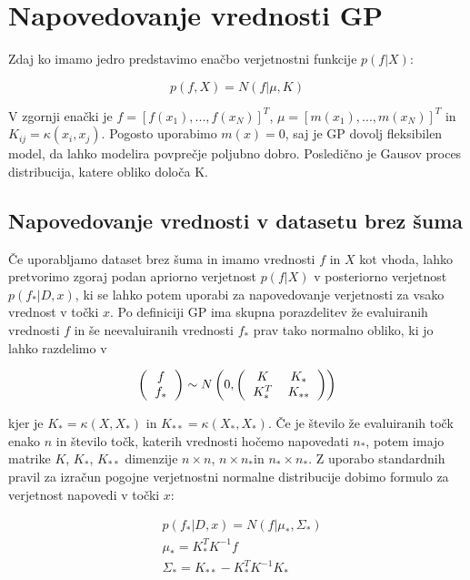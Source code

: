 \documentclass[a4paper, 12pt]{book}
\begin{document}
\section{Napovedovanje vrednosti GP}

Zdaj ko imamo jedro predstavimo enačbo verjetnostni funkcije $p(f|X)$:

\begin{equation}
	p(f,X) = N(f|\mu, K)
\end{equation}

V zgornji enački je $f = {[f(x_1), ..., f(x_N)]}^T$, $\mu = {[m(x_1), ..., m(x_N)]}^T$ in $K_{ij} = \kappa(x_i,x_j)$.
Pogosto uporabimo $m(x)=0$, saj je GP dovolj fleksibilen model, da lahko modelira povprečje poljubno dobro.
Posledično je Gausov proces distribucija, katere obliko določa K.

\subsection{Napovedovanje vrednosti v datasetu brez šuma}

Če uporabljamo dataset brez šuma in imamo vrednosti $f$ in $X$ kot vhoda, lahko pretvorimo zgoraj podan apriorno verjetnost $p(f|X)$ v posteriorno verjetnost $p(f_*| D,x)$, ki se lahko potem uporabi za napovedovanje verjetnosti za vsako vrednost v točki $x$.
Po definiciji GP ima skupna porazdelitev že evaluiranih vrednosti $f$ in še neevaluiranih vrednosti $f_*$ prav tako normalno obliko, ki jo lahko razdelimo v

\begin{equation}
\left(
\begin{tabular}{c} 
$f$ \\
 $f_*$
\end{tabular}
 \right) \sim N
 \left( 0, \left(
 \begin{tabular}{cc} 
 $K$ & $K_*$ \\
 $K_*^T$ & $K_{**}$
 \end{tabular}
 \right)
 \right)
\end{equation}

kjer je $K_* = \kappa(X,X_*)$ in $K_{**} = \kappa(X_*,X_*)$.
Če je število že evaluiranih točk enako $n$ in število točk, katerih vrednosti hočemo napovedati $n_*$, potem imajo matrike $K$, $K_*$, $K_{**}$ dimenzije $n \times n$, $n \times n_*$in  $n_* \times n_*$. 
Z uporabo standardnih pravil za izračun pogojne verjetnostni normalne distribucije dobimo formulo za verjetnost napovedi v točki $x$:

\begin{equation}
\begin{split}
	&p(f_*|D,x) = N(f|\mu_*, \Sigma_*) \\
	&\mu_* = K_*^TK^{-1}f \\
	&\Sigma_* = K_{**} - K_*^TK^{-1}K_*
\end{split}
\end{equation}
\end{document}
